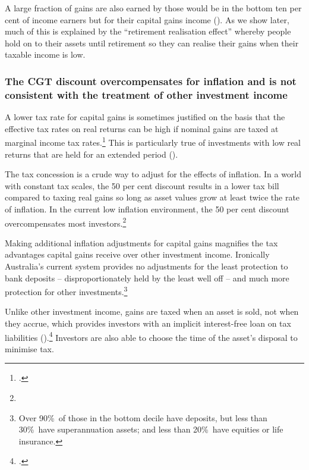 \documentclass{grattan}\usepackage[]{graphicx}\usepackage[]{color}
\begin{document}
A large fraction of gains are also earned by those would be in the bottom ten per cent of income earners but for their capital gains income (). As we show later, much of this is explained by the ``retirement realisation effect'' whereby people hold on to their assets until retirement so they can realise their gains when their taxable income is low. 


\subsubsection{The CGT discount overcompensates for inflation and is not consistent with the treatment of other investment income}
A lower tax rate for capital gains is sometimes justified on the basis that the effective tax rates on real returns can be high if nominal gains are taxed at marginal income tax rates.\footcite{Treasury2010} This is particularly true of investments with low real returns that are held for an extended period ().

The tax concession is a crude way to adjust for the effects of inflation. In a world with constant tax scales, the 50 per cent discount results in a lower tax bill compared to taxing real gains so long as asset values grow at least twice the rate of inflation. In the current low inflation environment, the 50 per cent discount overcompensates most investors.\footnote{}





Making additional inflation adjustments for capital gains magnifies the tax advantages capital gains receive over other investment income. Ironically Australia's current system provides no adjustments for the least protection to bank deposits -- disproportionately held by the least well off -- and much more protection for other investments.\footnote{Over 90\%\ of those in the bottom decile have deposits, but less than 30\%\ have superannuation assets; and less than 20\%\ have equities or life insurance.}

Unlike other investment income, gains are taxed when an asset is sold, not when they accrue, which provides investors with an implicit interest-free loan on tax liabilities ().\footcites[See also:][p.~2]{Fane2004}[p.~12]{Ingles2009} Investors are also able to choose the time of the asset's disposal to minimise tax. 
\end{document}
